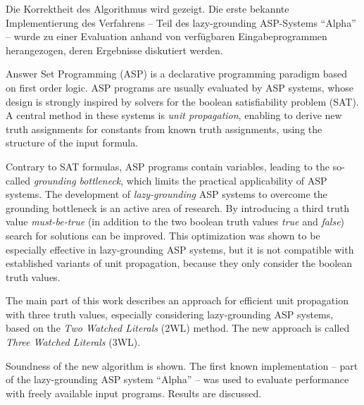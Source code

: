\documentclass[final]{vutinfth} %
\newcommand{\mbt}{must-be-true\xspace}
\begin{document}
\begin{kurzfassung*}
Die Korrektheit des Algorithmus wird gezeigt. Die erste bekannte Implementierung des Verfahrens -- Teil des lazy-grounding ASP-Systems \enquote{Alpha} -- wurde zu einer Evaluation anhand von  verfügbaren Eingabeprogrammen herangezogen, deren Ergebnisse diskutiert werden.
\end{kurzfassung*}


\begin{abstract*}
Answer Set Programming (ASP) is a declarative programming paradigm based on first order logic. ASP programs are usually evaluated by ASP systems, whose design is strongly inspired by solvers for the boolean satisfiability problem (SAT). A central method in these systems is \emph{unit propagation}, enabling to derive new truth assignments for constants from known truth assignments, using the structure of the input formula.

Contrary to SAT formulas, ASP programs contain variables, leading to the so-called \emph{grounding bottleneck}, which limits the practical applicability of ASP systems. The development of \emph{lazy-grounding} ASP systems to overcome the grounding bottleneck is an active area of research. By introducing a third truth value \emph{\mbt} (in addition to the two boolean truth values \emph{true} and \emph{false}) search for solutions can be improved. This optimization was shown to be especially effective in lazy-grounding ASP systems, but it is not compatible with established variants of unit propagation, because they only consider the boolean truth values.

The main part of this work describes an approach for efficient unit propagation with three truth values, especially considering lazy-grounding ASP systems, based on the \emph{Two Watched Literals} (2WL) method. The new approach is called \emph{Three Watched Literals} (3WL).

Soundness of the new algorithm is shown. The first known implementation -- part of the lazy-grounding ASP system \enquote{Alpha} -- was used to evaluate performance with freely available input programs. Results are discussed.
\end{abstract*}
\end{document}
